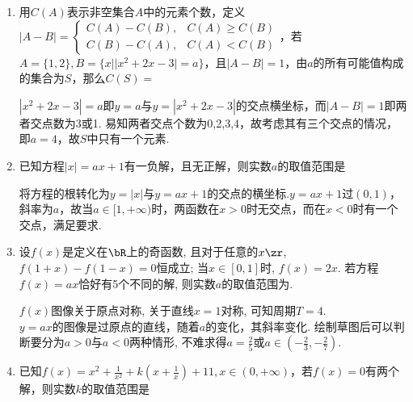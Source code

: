 \begin{enumerate}
\begin{enumerate}
\begin{jieda}
\begin{enumerate}
                \item 当$a \in (-\infty, -2\sqrt{2}) \cup (2\sqrt{2}, +\infty)$时，若有$-\dfrac{a}{3} = \dfrac{-a \pm \sqrt{a^2-8}}{2}$可使得$C(B) = 3$，解得$a = \pm 3$
            \end{enumerate}
            综上$S = \{0, 2\sqrt{2}, -2\sqrt{2}, 3, -3\}$，因此$C(S) = 5$
        \end{jieda} 
        \item 用$C(A)$表示非空集合$A$中的元素个数，定义$|A-B| = \left \{ \begin{array}{ll}
            C(A) - C(B), & C(A) \geq C(B) \\
            C(B) - C(A), & C(A) < C(B)
        \end{array}\right.$，若$A = \{1,2\}, B = \{x | |x^2+2x-3| = a\}$，且$|A-B| = 1$，由$a$的所有可能值构成的集合为$S$，那么$C(S) = $
        \begin{jieda}
            $|x^2+2x-3| = a$即$y = a$与$y = |x^2+2x-3|$的交点横坐标，而$|A-B| = 1$即两者交点数为3或1. 易知两者交点个数为0,2,3,4，故考虑其有三个交点的情况，即$a = 4$，故$S$中只有一个元素.
        \end{jieda}
        \item 已知方程$|x| = ax+1$有一负解，且无正解，则实数$a$的取值范围是\blkda{$[1, +\infty)$ }
        \begin{jieda}
            将方程的根转化为$y = |x|$与$y = ax+1$的交点的横坐标.$y = ax+1$过$(0, 1)$，斜率为$a$，故当$a \in [1, +\infty)$时，两函数在$x > 0$时无交点，而在$x < 0$时有一个交点，满足要求.
        \end{jieda}
        \item 设$f(x)$是定义在$\bR$上的奇函数, 且对于任意的$x\zr$, $f(1+x)-f(1-x)=0$恒成立; 当$x\in[0,1]$时, $f(x)=2x$. 
        若方程$f(x)=ax$恰好有5个不同的解, 则实数$a$的取值范围为. 
        \begin{jieda}
        $f(x)$图像关于原点对称, 关于直线$x=1$对称, 可知周期$T=4$. \\
        $y = ax$的图像是过原点的直线，随着$a$的变化，其斜率变化. 绘制草图后可以判断要分为$a>0$与$a<0$两种情形, 
        不难求得$a=\frac{2}{5}$或$a\in(-\frac{2}{3},-\frac{2}{7})$. 
        \end{jieda}
        \item 已知$f(x) = x^2 + \frac{1}{x^2} + k (x + \frac{1}{x})+11, x \in (0, +\infty)$，若$f(x) = 0$有两个解，则实数$k$的取值范围是
        \begin{jieda}

\end{jieda}
\end{enumerate}
\end{enumerate}
